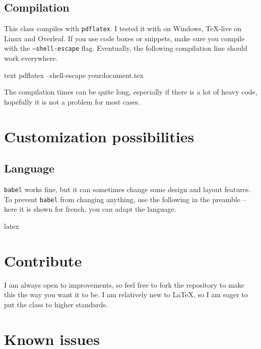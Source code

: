 \documentclass[
	a4paper,
	raggedright,
	twoside,
	12pt,
	colorful,
]{tufte-style-article}
\begin{document}
\subsection{Compilation}

This class compiles with \texttt{pdflatex}. I tested it with  on Windows, \TeX-live on Linux and Overleaf. If you use code boxes or snippets, make sure you compile with the \texttt{--shell-escape} flag. Eventually, the following compilation line should work everywhere.
\begin{codebox}{text}
pdflatex --shell-escape yourdocument.tex
\end{codebox}
The compilation times can be quite long, especially if there is a lot of heavy code, hopefully it is not a problem for most cases.


\section{Customization possibilities}
\label{sec:customization-possibilities}

\subsection{Language}

\texttt{babel} works fine, but it can sometimes change some design and layout features. To prevent \texttt{babel} from changing anything, use the following in the preamble --here it is shown for french, you can adapt the language.
\begin{codebox}{latex}
\end{codebox}


\section{Contribute}
\label{sec:contribute}

I am always open to improvements, so feel free to fork the repository to make this the way you want it to be. I am relatively new to \LaTeX{}, so I am eager to put the class to higher standards.


\section{Known issues}
\label{sec:known-issues}
\end{document}

